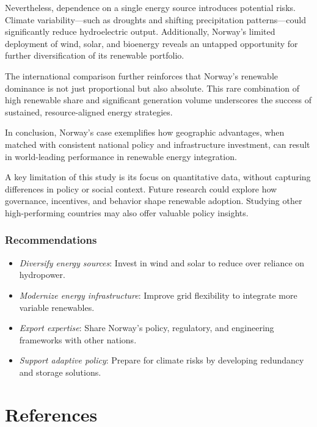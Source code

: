 \documentclass[
  11pt,
  a4paper,
]{article}
\providecommand{\tightlist}{%
  \setlength{\itemsep}{0pt}\setlength{\parskip}{0pt}}\usepackage{longtable,booktabs,array}
\begin{document}
Nevertheless, dependence on a single energy source introduces potential
risks. Climate variability---such as droughts and shifting precipitation
patterns---could significantly reduce hydroelectric output.
Additionally, Norway's limited deployment of wind, solar, and bioenergy
reveals an untapped opportunity for further diversification of its
renewable portfolio.

The international comparison further reinforces that Norway's renewable
dominance is not just proportional but also absolute. This rare
combination of high renewable share and significant generation volume
underscores the success of sustained, resource-aligned energy
strategies.

In conclusion, Norway's case exemplifies how geographic advantages, when
matched with consistent national policy and infrastructure investment,
can result in world-leading performance in renewable energy integration.

A key limitation of this study is its focus on quantitative data,
without capturing differences in policy or social context. Future
research could explore how governance, incentives, and behavior shape
renewable adoption. Studying other high-performing countries may also
offer valuable policy insights.

\subsubsection{Recommendations}\label{recommendations}

\begin{itemize}
\tightlist
\item
  \emph{Diversify energy sources}: Invest in wind and solar to reduce
  over reliance on hydropower.
\item
  \emph{Modernize energy infrastructure}: Improve grid flexibility to
  integrate more variable renewables.
\item
  \emph{Export expertise}: Share Norway's policy, regulatory, and
  engineering frameworks with other nations.
\item
  \emph{Support adaptive policy}: Prepare for climate risks by
  developing redundancy and storage solutions.
\end{itemize}

\newpage

\section{References}\label{references}

\printbibliography[heading=none]
\end{document}
